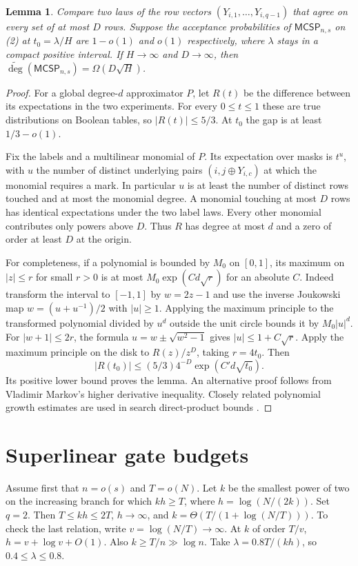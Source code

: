 \documentclass[11pt]{article}
\newtheorem{lemma}[theorem]{Lemma}
\newcommand{\mc}{\mathsf{MCSP}}
\newcommand{\ad}{\widetilde{\deg}}
\begin{document}
\begin{lemma}\label{lem:analytic}
Compare two laws of the row vectors $(Y_{i,1},\ldots,Y_{i,q-1})$ that agree on every set of at most $D$ rows. Suppose the acceptance probabilities of $\mc_{n,s}$ on (2) at $t_0=\lambda/H$ are $1-o(1)$ and $o(1)$ respectively, where $\lambda$ stays in a compact positive interval. If $H\to\infty$ and $D\to\infty$, then $\ad(\mc_{n,s})=\Omega(D\sqrt H)$.
\end{lemma}
\begin{proof}
For a global degree-$d$ approximator $P$, let $R(t)$ be the difference between its expectations in the two experiments. For every $0\le t\le1$ these are true distributions on Boolean tables, so $|R(t)|\le5/3$. At $t_0$ the gap is at least $1/3-o(1)$.

Fix the labels and a multilinear monomial of $P$. Its expectation over masks is $t^u$, with $u$ the number of distinct underlying pairs $(i,j\oplus Y_{i,c})$ at which the monomial requires a mark. In particular $u$ is at least the number of distinct rows touched and at most the monomial degree. A monomial touching at most $D$ rows has identical expectations under the two label laws. Every other monomial contributes only powers above $D$. Thus $R$ has degree at most $d$ and a zero of order at least $D$ at the origin.

For completeness, if a polynomial is bounded by $M_0$ on $[0,1]$, its maximum on $|z|\le r$ for small $r>0$ is at most $M_0\exp(Cd\sqrt r)$ for an absolute $C$. Indeed transform the interval to $[-1,1]$ by $w=2z-1$ and use the inverse Joukowski map $w=(u+u^{-1})/2$ with $|u|\ge1$. Applying the maximum principle to the transformed polynomial divided by $u^d$ outside the unit circle bounds it by $M_0|u|^d$. For $|w+1|\le2r$, the formula $u=w\pm\sqrt{w^2-1}$ gives $|u|\le1+C\sqrt r$. Apply the maximum principle on the disk to $R(z)/z^D$, taking $r=4t_0$. Then
\[
            |R(t_0)|\le (5/3)4^{-D}\exp(C'd\sqrt{t_0}).
\]
Its positive lower bound proves the lemma. An alternative proof follows from Vladimir Markov's higher derivative inequality. Closely related polynomial growth estimates are used in search direct-product bounds \cite{ksw}.
\end{proof}

\section{Superlinear gate budgets}
Assume first that $n=o(s)$ and $T=o(N)$. Let $k$ be the smallest power of two on the increasing branch for which $kh\ge T$, where $h=\log(N/(2k))$. Set $q=2$. Then $T\le kh\le2T$, $h\to\infty$, and $k=\Theta(T/(1+\log(N/T)))$. To check the last relation, write $v=\log(N/T)\to\infty$. At $k$ of order $T/v$, $h=v+\log v+O(1)$. Also $k\ge T/n\gg\log n$. Take $\lambda=0.8T/(kh)$, so $0.4\le\lambda\le0.8$.
\end{document}
